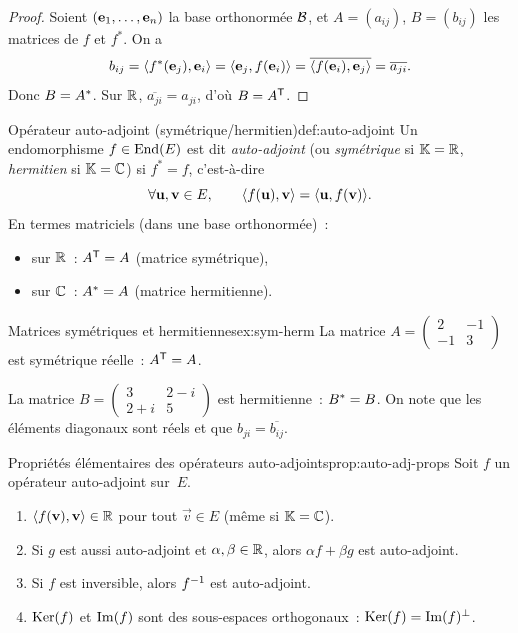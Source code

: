 \begin{proof}
  Soient $(\mathbf{e}_{1},\ldots,\mathbf{e}_{n})$ la base orthonormée ${\mathcal{B}}$, et
  $A = (a_{ij})$, $B = (b_{ij})$ les matrices de $f$ et $f^*$. On a
  \[
    b_{ij} = \langle f^*(\mathbf{e}_{j}), \mathbf{e}_{i}\rangle
           = \langle\mathbf{e}_{j}, f(\mathbf{e}_{i})\rangle
           = \overline{\langle f(\mathbf{e}_{i}), \mathbf{e}_{j}\rangle}
           = \overline{a_{ji}}.
  \]
  Donc $B = {A}^{*}$. Sur ${\mathbb{R}}$, $\overline{a_{ji}} = a_{ji}$, d'où
  $B = {A}^{\mathsf{T}}$.
\end{proof}

\begin{definition}{Opérateur auto-adjoint (symétrique/hermitien)}{def:auto-adjoint}
  Un endomorphisme $f \in \operatorname{End}(E)$ est dit
  \emph{auto-adjoint} (ou
  \emph{symétrique} si ${\mathbb{K}} = {\mathbb{R}}$,
  \emph{hermitien} si ${\mathbb{K}} = {\mathbb{C}}$) si
  $f^* = f$, c'est-à-dire
  \[
    \forall \mathbf{u}, \mathbf{v} \in E, \qquad
    \langle f(\mathbf{u}), \mathbf{v}\rangle = \langle\mathbf{u}, f(\mathbf{v})\rangle.
  \]
  En termes matriciels (dans une base orthonormée)~:
  \begin{itemize}
    \item sur ${\mathbb{R}}$~: ${A}^{\mathsf{T}} = A$ (matrice symétrique),
    \item sur ${\mathbb{C}}$~: ${A}^{*} = A$ (matrice hermitienne).
  \end{itemize}
\end{definition}

\begin{example}{Matrices symétriques et hermitiennes}{ex:sym-herm}
  La matrice $A = \begin{pmatrix} 2 & -1 \\ -1 & 3 \end{pmatrix}$ est
  symétrique réelle~: ${A}^{\mathsf{T}} = A$.

  La matrice $B = \begin{pmatrix} 3 & 2-i \\ 2+i & 5 \end{pmatrix}$ est
  hermitienne~: ${B}^{*} = B$. On note que les éléments diagonaux
  sont réels et que $b_{ji} = \overline{b_{ij}}$.
\end{example}

\begin{proposition}{Propriétés élémentaires des opérateurs auto-adjoints}{prop:auto-adj-props}
  Soit $f$ un opérateur auto-adjoint sur~$E$.
  \begin{enumerate}[label=(\roman*)]
    \item $\langle f(\mathbf{v}), \mathbf{v}\rangle \in {\mathbb{R}}$ pour tout $\vec{v} \in E$
      (même si ${\mathbb{K}} = {\mathbb{C}}$).
    \item Si $g$ est aussi auto-adjoint et $\alpha, \beta \in {\mathbb{R}}$, alors
      $\alpha f + \beta g$ est auto-adjoint.
    \item Si $f$ est inversible, alors ${f}^{-1}$ est auto-adjoint.
    \item $\operatorname{Ker}(f)$ et $\operatorname{Im}(f)$ sont des sous-espaces orthogonaux~:
      $\operatorname{Ker}(f) = \operatorname{Im}(f)^\perp$.
  \end{enumerate}
\end{proposition}


